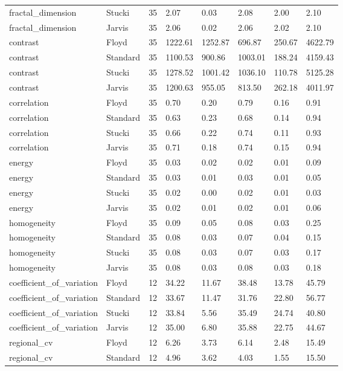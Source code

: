 \begin{tabular}{llrlllll}
fractal_dimension & Stucki & 35 & 2.07 & 0.03 & 2.08 & 2.00 & 2.10 \\
fractal_dimension & Jarvis & 35 & 2.06 & 0.02 & 2.06 & 2.02 & 2.10 \\
contrast & Floyd & 35 & 1222.61 & 1252.87 & 696.87 & 250.67 & 4622.79 \\
contrast & Standard & 35 & 1100.53 & 900.86 & 1003.01 & 188.24 & 4159.43 \\
contrast & Stucki & 35 & 1278.52 & 1001.42 & 1036.10 & 110.78 & 5125.28 \\
contrast & Jarvis & 35 & 1200.63 & 955.05 & 813.50 & 262.18 & 4011.97 \\
correlation & Floyd & 35 & 0.70 & 0.20 & 0.79 & 0.16 & 0.91 \\
correlation & Standard & 35 & 0.63 & 0.23 & 0.68 & 0.14 & 0.94 \\
correlation & Stucki & 35 & 0.66 & 0.22 & 0.74 & 0.11 & 0.93 \\
correlation & Jarvis & 35 & 0.71 & 0.18 & 0.74 & 0.15 & 0.94 \\
energy & Floyd & 35 & 0.03 & 0.02 & 0.02 & 0.01 & 0.09 \\
energy & Standard & 35 & 0.03 & 0.01 & 0.03 & 0.01 & 0.05 \\
energy & Stucki & 35 & 0.02 & 0.00 & 0.02 & 0.01 & 0.03 \\
energy & Jarvis & 35 & 0.02 & 0.01 & 0.02 & 0.01 & 0.06 \\
homogeneity & Floyd & 35 & 0.09 & 0.05 & 0.08 & 0.03 & 0.25 \\
homogeneity & Standard & 35 & 0.08 & 0.03 & 0.07 & 0.04 & 0.15 \\
homogeneity & Stucki & 35 & 0.08 & 0.03 & 0.07 & 0.03 & 0.17 \\
homogeneity & Jarvis & 35 & 0.08 & 0.03 & 0.08 & 0.03 & 0.18 \\
coefficient_of_variation & Floyd & 12 & 34.22 & 11.67 & 38.48 & 13.78 & 45.79 \\
coefficient_of_variation & Standard & 12 & 33.67 & 11.47 & 31.76 & 22.80 & 56.77 \\
coefficient_of_variation & Stucki & 12 & 33.84 & 5.56 & 35.49 & 24.74 & 40.80 \\
coefficient_of_variation & Jarvis & 12 & 35.00 & 6.80 & 35.88 & 22.75 & 44.67 \\
regional_cv & Floyd & 12 & 6.26 & 3.73 & 6.14 & 2.48 & 15.49 \\
regional_cv & Standard & 12 & 4.96 & 3.62 & 4.03 & 1.55 & 15.50 \\

\end{tabular}
